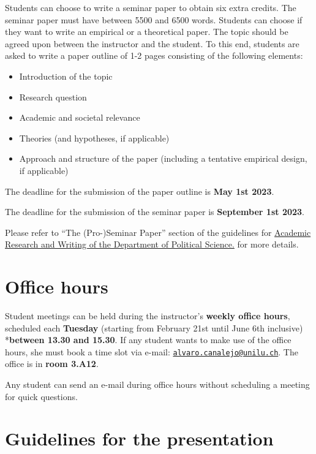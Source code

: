 \documentclass[
  12pt,
]{article}
\begin{document}
Students can choose to write a seminar paper to obtain six extra
credits. The seminar paper must have between 5500 and 6500 words.
Students can choose if they want to write an empirical or a theoretical
paper. The topic should be agreed upon between the instructor and the
student. To this end, students are asked to write a paper outline of 1-2
pages consisting of the following elements:

\begin{itemize}
\item
  Introduction of the topic
\item
  Research question
\item
  Academic and societal relevance
\item
  Theories (and hypotheses, if applicable)
\item
  Approach and structure of the paper (including a tentative empirical
  design, if applicable)
\end{itemize}

The deadline for the submission of the paper outline is \textbf{May 1st
2023}.

The deadline for the submission of the seminar paper is
\textbf{September 1st 2023}.

Please refer to ``The (Pro-)Seminar Paper'' section of the guidelines
for
\href{https://www.unilu.ch/fileadmin/fakultaeten/ksf/institute/polsem/Dok/Studium/2016-Jan_Guidelines_Booklet_engl.pdf}{Academic
Research and Writing of the Department of Political Science.} for more
details.

\hypertarget{office-hours}{%
\section{Office hours}\label{office-hours}}

Student meetings can be held during the instructor's \textbf{weekly
office hours}, scheduled each \textbf{Tuesday} (starting from February
21st until June 6th inclusive) *\textbf{between 13.30 and 15.30}. If any
student wants to make use of the office hours, she must book a time slot
via e-mail:
\href{mailto:alvaro.canalejo@unilu.ch}{\nolinkurl{alvaro.canalejo@unilu.ch}}.
The office is in \textbf{room 3.A12}.

Any student can send an e-mail during office hours without scheduling a
meeting for quick questions.

\hypertarget{guidelines-for-the-presentation}{%
\section{Guidelines for the
presentation}\label{guidelines-for-the-presentation}}
\end{document}
